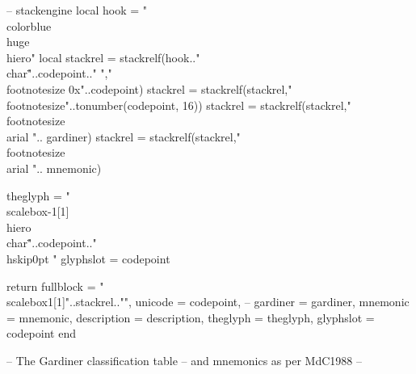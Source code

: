 \documentclass{article}
\begin{document}
\begin{luacode*}
-- stackengine 
   local hook = "\\color{blue}\\huge\\hiero"
   local stackrel = stackrelf(hook.."\\char\""..codepoint.." ","\\footnotesize 0x"..codepoint)
   stackrel = stackrelf(stackrel,"\\footnotesize"..tonumber(codepoint, 16))
   stackrel = stackrelf(stackrel,"\\footnotesize \\arial ".. gardiner)
stackrel = stackrelf(stackrel,"\\footnotesize \\arial ".. mnemonic)
  
  theglyph = "\\scalebox{-1}[1]{\\hiero\\char\""..codepoint.."\\hskip0pt }"
  glyphslot = codepoint


return {  fullblock = "\\scalebox{1}[1]{"..stackrel.."}", 
          unicode   = codepoint, --
          gardiner  = gardiner,
          mnemonic  = mnemonic,
          description = description,
          theglyph  = theglyph,
          glyphslot = codepoint}
end

-- The Gardiner classification table
-- and mnemonics as per MdC1988 
--   


\end{luacode*}
\end{document}
